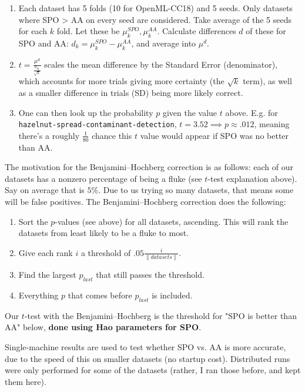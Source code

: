 \documentclass[sigconf,screen]{acmart}
\begin{document}
\begin{enumerate}
    \item Each dataset has 5 folds (10 for OpenML-CC18) and 5 seeds. Only datasets where SPO > AA on every seed are considered. Take average of the 5 seeds for each $k$ fold. Let these be $\mu_k^{SPO},\mu_k^{AA}$. Calculate differences $d$ of these for SPO and AA: $d_k = \mu_k^{SPO} - \mu_k^{AA}$, and average into $\mu^{d}$.
    \item $t=\frac{\mu^d}{\frac{\sigma_{d_k}}{\sqrt{k}}}$ scales the mean difference by the Standard Error (denominator), which accounts for more trials giving more certainty (the $\sqrt{k}$ term), as well as a smaller difference in trials (SD) being more likely correct.
    \item One can then look up the probability $p$ given the value $t$ above. E.g. for \texttt{hazelnut-spread-contaminant-detection}, $t=3.52\implies p\approx .012$, meaning there's a roughly $\frac{1}{80}$ chance this $t$ value would appear if SPO was no better than AA.
\end{enumerate}

The motivation for the Benjamini–Hochberg correction is as follows: each of our datasets has a nonzero percentage of being a fluke (see $t$-test explanation above). Say on average that is $5\%$. Due to us trying so many datasets, that means some will be false positives. The Benjamini–Hochberg correction does the following:

\begin{enumerate}
    \item Sort the $p$-values (see above) for all datasets, ascending. This will rank the datasets from least likely to be a fluke to most.
    \item Give each rank $i$ a threshold of $.05 \frac{i}{\|datasets\|}$.
    \item Find the largest $p_{last}$ that still passes the threshold. 
    \item Everything $p$ that comes before $p_{last}$ is included.
\end{enumerate}

Our $t$-test with the Benjamini–Hochberg is the threshold for "SPO is better than AA" below, \textbf{done using Hao parameters for SPO}.

Single-machine results are used to test whether SPO vs. AA is more accurate, due to the speed of this on smaller datasets (no startup cost). Distributed runs were only performed for some of the datasets (rather, I ran those before, and kept them here). 
\end{document}
